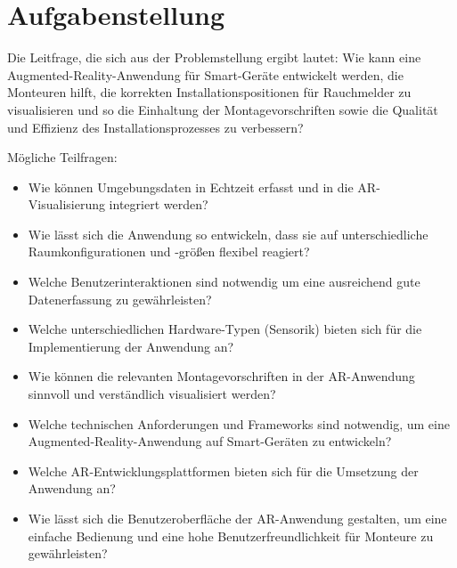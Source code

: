 \section{Aufgabenstellung}
\label{sec:goals}
Die Leitfrage, die sich aus der Problemstellung ergibt lautet: Wie kann eine Augmented-Reality-Anwendung f\"ur Smart-Ger\"ate entwickelt werden, die Monteuren hilft, die korrekten Installationspositionen f\"ur Rauchmelder zu visualisieren und so die Einhaltung der Montagevorschriften sowie die Qualit\"at und Effizienz des Installationsprozesses zu verbessern?

M\"ogliche Teilfragen:

\begin{itemize}
\item Wie k\"onnen Umgebungsdaten in Echtzeit erfasst und in die AR-Visualisierung integriert werden?
\item Wie l\"asst sich die Anwendung so entwickeln, dass sie auf unterschiedliche Raumkonfigurationen und -gr\"o{\ss}en flexibel reagiert?
\item Welche Benutzerinteraktionen sind notwendig um eine ausreichend gute Datenerfassung zu gew\"ahrleisten?
\item Welche unterschiedlichen Hardware-Typen (Sensorik) bieten sich f\"ur die Implementierung der Anwendung an?
\item Wie k\"onnen die relevanten Montagevorschriften in der AR-Anwendung sinnvoll und verst\"andlich visualisiert werden?
\item Welche technischen Anforderungen und Frameworks sind notwendig, um eine Augmented-Reality-Anwendung auf Smart-Ger\"aten zu entwickeln?
\item Welche AR-Entwicklungsplattformen bieten sich f\"ur die Umsetzung der Anwendung an?
\item Wie l\"asst sich die Benutzeroberfl\"ache der AR-Anwendung gestalten, um eine einfache Bedienung und eine hohe Benutzerfreundlichkeit f\"ur Monteure zu gew\"ahrleisten?
\end{itemize}
